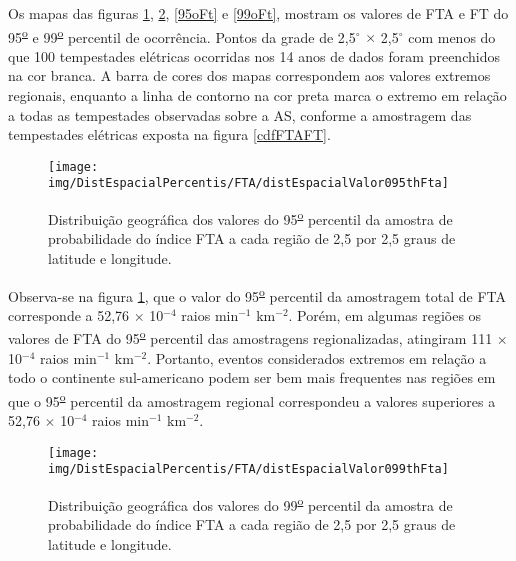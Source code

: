 
Os mapas das figuras \ref{95oFta}, \ref{99oFta}, \ref{95oFt}  e \ref{99oFt}, mostram os valores de FTA e FT do 95\textsuperscript{\underline{o}} e 99\textsuperscript{\underline{o}} percentil de ocorrência. Pontos da grade de 2,5$^{\circ}$ $\times$ 2,5$^{\circ}$ com menos do que 100 tempestades elétricas ocorridas nos 14 anos de dados foram preenchidos na cor branca. A barra de cores dos mapas correspondem aos valores extremos regionais, enquanto a linha de contorno na cor preta marca o extremo em relação a todas as tempestades observadas sobre a AS, conforme a amostragem das tempestades elétricas exposta na figura \ref{cdfFTAFT}.

\begin{figure}[!ht]
\centering
{\texttt{[image: img/DistEspacialPercentis/FTA/distEspacialValor095thFta]}} 
\caption{Distribuição geográfica dos valores do 95\textsuperscript{\underline{o}} percentil da amostra de probabilidade do índice FTA a cada região de 2,5 por 2,5 graus de latitude e longitude.}
\label{95oFta}
\end{figure}

Observa-se na figura \ref{95oFta}, que o valor do 95\textsuperscript{\underline{o}} percentil da amostragem total de FTA corresponde a 52,76 $\times$ 10$^{-4}$ raios min$^{-1}$
km$^{-2}$. Porém, em algumas regiões os valores de FTA do 95\textsuperscript{\underline{o}} percentil das amostragens regionalizadas, atingiram  111 $\times$ 10$^{-4}$ raios min$^{-1}$ km$^{-2}$. Portanto, eventos considerados extremos em relação a todo o continente sul-americano podem ser bem mais frequentes nas regiões em que o 95\textsuperscript{\underline{o}} percentil da amostragem regional correspondeu a valores superiores a 52,76 $\times$ 10$^{-4}$ raios min$^{-1}$ km$^{-2}$.
  
\begin{figure}[!ht]
\centering  
{\texttt{[image: img/DistEspacialPercentis/FTA/distEspacialValor099thFta]}}
\caption{Distribuição geográfica dos valores do  99\textsuperscript{\underline{o}} percentil da amostra de probabilidade do índice FTA a cada região de 2,5 por 2,5 graus de latitude e longitude.}
\label{99oFta}
\end{figure} 

